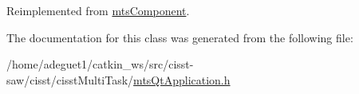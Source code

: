 Reimplemented from \hyperlink{classmts_component_aaf28f0262b44eb6866e10089a02fa6e4}{mts\-Component}.



The documentation for this class was generated from the following file\-:\begin{DoxyCompactItemize}
\item 
/home/adeguet1/catkin\-\_\-ws/src/cisst-\/saw/cisst/cisst\-Multi\-Task/\hyperlink{mts_qt_application_8h}{mts\-Qt\-Application.\-h}\end{DoxyCompactItemize}
